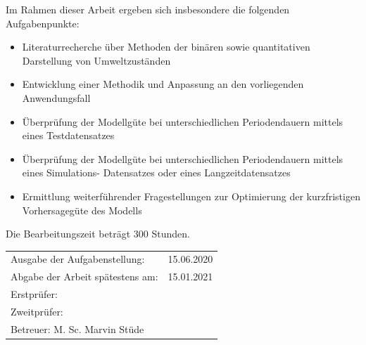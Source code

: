 \begin{spacing}{1}
Im Rahmen dieser Arbeit ergeben sich insbesondere die folgenden Aufgabenpunkte:

\begin{itemize}
	\item{Literaturrecherche über Methoden der binären sowie quantitativen Darstellung von Umweltzuständen}
	\item{Entwicklung einer Methodik und Anpassung an den vorliegenden Anwendungsfall}
	\item{Überprüfung der Modellgüte bei unterschiedlichen Periodendauern mittels eines Testdatensatzes}
	\item{Überprüfung der Modellgüte bei unterschiedlichen Periodendauern mittels eines Simulations- Datensatzes oder eines Langzeitdatensatzes}
	\item{Ermittlung weiterführender Fragestellungen zur Optimierung der kurzfristigen Vorhersagegüte des Modells}
\end{itemize}

Die Bearbeitungszeit beträgt 300 Stunden.

\vfill
\begin{center}
\begin{tabular}{p{} p{}}
Ausgabe der Aufgabenstellung:&15.06.2020\\
Abgabe der Arbeit spätestens am:&15.01.2021\\
Erstprüfer: \\
Zweitprüfer: \\
Betreuer: M. Sc. Marvin Stüde
\end{tabular}
\end{center}

\end{spacing}
\cleardoublepage